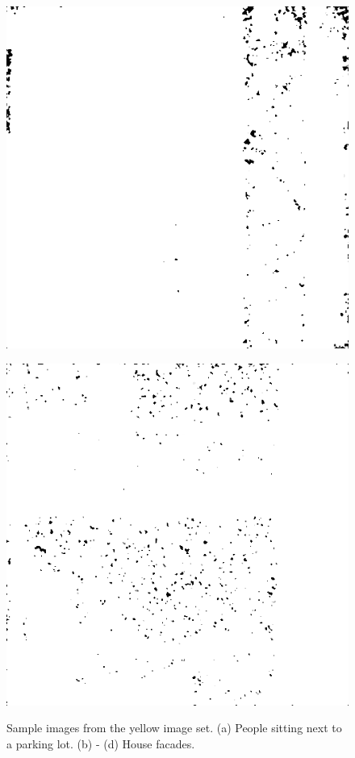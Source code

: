 \begin{figure}[H]
\begin{minipage}[t]{0.245\textwidth}
    \subcaption{}
    \label{fig:half2}
\end{minipage}
\begin{minipage}[t]{0.245\textwidth}
    \includegraphics[width=1\textwidth]{result/SPC_NRQA/h43_512_m30.PNG}
    \subcaption{}
    \label{fig:half3}
\end{minipage}
\begin{minipage}[t]{0.245\textwidth}
    \includegraphics[width = \textwidth]{result/SPC_NRQA/h35_512_m30.PNG}
    \subcaption{}
    \label{fig:half4}
\end{minipage}
    \caption{Sample images from the yellow image set.
    (a)  People sitting next to a parking lot. (b) - (d) House facades.}
    \label{fig:half}
\end{figure}

